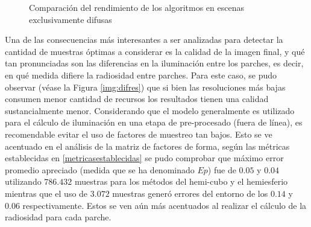 \begin{figure}
\caption{Comparación del rendimiento de los algoritmos en escenas exclusivamente difusas}
\label{plot:emglc1}
\end{figure}

Una de las consecuencias más interesantes a ser analizadas para detectar la cantidad de muestras óptimas a considerar es la calidad de la imagen final, y qué tan pronunciadas son las diferencias en la iluminación entre los parches, es decir, en qué medida difiere la radiosidad entre parches. Para este caso, se pudo observar (véase la Figura \ref{img:difres}) que si bien las resoluciones más bajas consumen menor cantidad de recursos los resultados tienen una calidad sustancialmente menor. Considerando que el modelo generalmente es utilizado para el cálculo de iluminación en una etapa de pre-procesado (fuera de línea), es recomendable evitar el uso de factores de muestreo tan bajos. Esto se ve acentuado en el análisis de la matriz de factores de forma, según las métricas establecidas en \ref{metricasestablecidas} se pudo comprobar que máximo error promedio apreciado (medida que se ha denominado $Ep$) fue de $0.05$ y $0.04$ utilizando $786.432$ muestras para los métodos del hemi-cubo y el hemiesferio mientras que el uso de $3.072$ muestras generó errores del entorno de los $0.14$ y $0.06$ respectivamente. Estos se ven aún más acentuados al realizar el cálculo de la radiosidad para cada parche.

